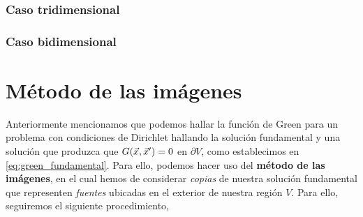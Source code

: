 \subsubsection{Caso tridimensional}



\subsubsection{Caso bidimensional}

\section{Método de las imágenes}

Anteriormente mencionamos que podemos hallar la función de Green para un problema con condiciones de Dirichlet hallando la solución fundamental y una solución que produzca que $G(\vec{x},\vec{x}') = 0$ en $\partial V$, como establecimos en \eqref{eq:green_fundamental}. Para ello, podemos hacer uso del \textbf{método de las imágenes}, en el cual hemos de considerar \emph{copias} de nuestra solución fundamental que representen \emph{fuentes} ubicadas en el exterior de nuestra región $V$. Para ello, seguiremos el siguiente procedimiento,
